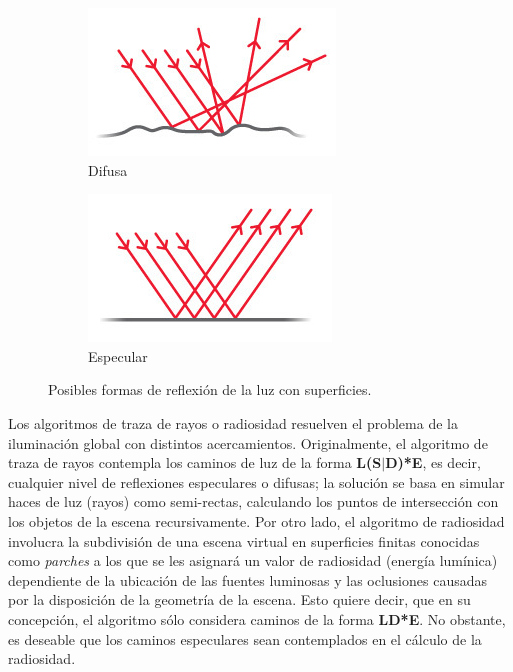 \vspace{5mm}
\begin{figure}[htbp]
	\begin{subfigure}{0.5\textwidth}
		\centering
		\includegraphics[width=1\linewidth]{assets/difusa1}
		\caption{Difusa}
	\end{subfigure}
	\begin{subfigure}{0.5\textwidth}
		\centering
		\includegraphics[width=1\linewidth]{assets/especular1}
		\caption{Especular}
	\end{subfigure}
	\caption{Posibles formas de reflexión de la luz con superficies.}
	\label{img:difspecularr}
\end{figure}

Los algoritmos de traza de rayos o radiosidad resuelven el problema de la iluminación global con distintos acercamientos. Originalmente, el algoritmo de traza de rayos contempla los caminos de luz de la forma \textbf{L(S$|$D)*E}, es decir, cualquier nivel de reflexiones especulares o difusas; la solución se basa en simular haces de luz (rayos) como semi-rectas, calculando los puntos de intersección con los objetos de la escena recursivamente. Por otro lado, el algoritmo de radiosidad involucra la subdivisión de una escena virtual en superficies finitas conocidas como \textit{parches} a los que se les asignará un valor de radiosidad (energía lumínica) dependiente de la ubicación de las fuentes luminosas y las oclusiones causadas por la disposición de la geometría de la escena. Esto quiere decir, que en su concepción, el algoritmo sólo considera caminos de la forma \textbf{LD*E}. No obstante, es deseable que los caminos especulares sean contemplados en el cálculo de la radiosidad.

